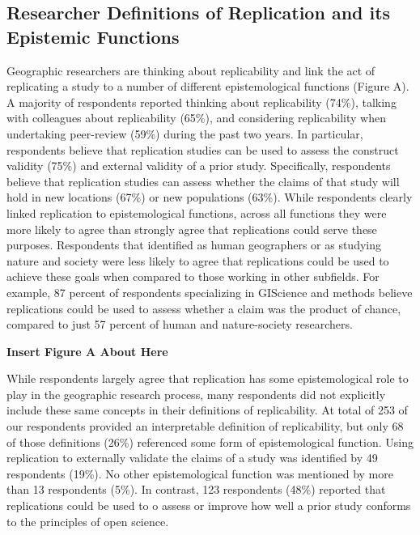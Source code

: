 \documentclass[]{interact}
\theoremstyle{plain}%
\theoremstyle{definition}
\theoremstyle{remark}
\begin{document}
\subsection*{Researcher Definitions of Replication and its Epistemic Functions}
Geographic researchers are thinking about replicability and link the act of replicating a study to a number of different epistemological functions (Figure A). 
A majority of respondents reported thinking about replicability (74\%), talking with colleagues about replicability (65\%), and considering replicability when undertaking peer-review (59\%) during the past two years. 
In particular, respondents believe that replication studies can be used to assess the construct validity (75\%) and external validity of a prior study.
Specifically, respondents believe that replication studies can assess whether the claims of that study will hold in new locations (67\%) or new populations (63\%). 
While respondents clearly linked replication to epistemological functions, across all functions they were more likely to agree than strongly agree that replications could serve these purposes.
Respondents that identified as human geographers or as studying nature and society were less likely to agree that replications could be used to achieve these goals when compared to those working in other subfields. 
For example, 87 percent of respondents specializing in GIScience and methods believe replications could be used to assess whether a claim was the product of chance, compared to just 57 percent of human and nature-society researchers.

\begin{center}
\textbf{Insert Figure A About Here}
\end{center}

While respondents largely agree that replication has some epistemological role to play in the geographic research process, many respondents did not explicitly include these same concepts in their definitions of replicability.
At total of 253 of our respondents provided an interpretable definition of replicability, but only 68 of those definitions (26\%) referenced some form of epistemological function. 
Using replication to externally validate the claims of a study was identified by 49 respondents (19\%).
No other epistemological function was mentioned by more than 13 respondents (5\%).  
In contrast, 123 respondents (48\%) reported that replications could be used to o assess or improve how well a prior study conforms to the principles of open science.
\end{document}
